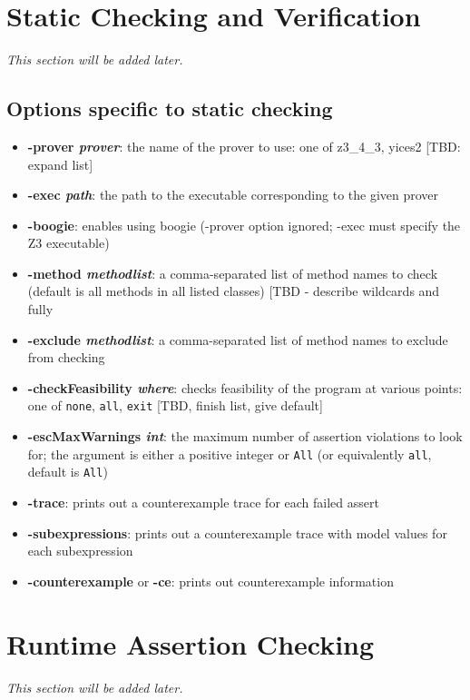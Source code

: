 \section{Static Checking and Verification}
\textit{This section will be added later.} %

\subsection{Options specific to static checking}
\begin{itemize}[noitemsep,nolistsep]
\item \textbf{-prover \textit{prover}}: the name of the prover to use: one of z3\_4\_3, yices2 [TBD: expand list]
\item \textbf{-exec \textit{path}}: the path to the executable corresponding to the given prover
\item \textbf{-boogie}: enables using boogie (-prover option ignored; -exec must specify the Z3 executable)
\item \textbf{-method \textit{methodlist}}: a comma-separated list of method names to check (default is all methods in all listed classes) [TBD - describe wildcards and fully 
\item \textbf{-exclude \textit{methodlist}}: a comma-separated list of method names to exclude from checking
\item \textbf{-checkFeasibility \textit{where}}: checks feasibility of the program at various points:
one of \texttt{none}, \texttt{all}, \texttt{exit} [TBD, finish list, give default]
\item \textbf{-escMaxWarnings \textit{int}}: the maximum number of assertion violations to look for; the argument is either a positive integer or \texttt{All} (or equivalently \texttt{all}, default is \texttt{All})
\item \textbf{-trace}: prints out a counterexample trace for each failed assert
\item \textbf{-subexpressions}: prints out a counterexample trace with model values for each subexpression
\item \textbf{-counterexample} or \textbf{-ce}: prints out counterexample information
\end{itemize}

\section{Runtime Assertion Checking}
\textit{This section will be added later.} %


